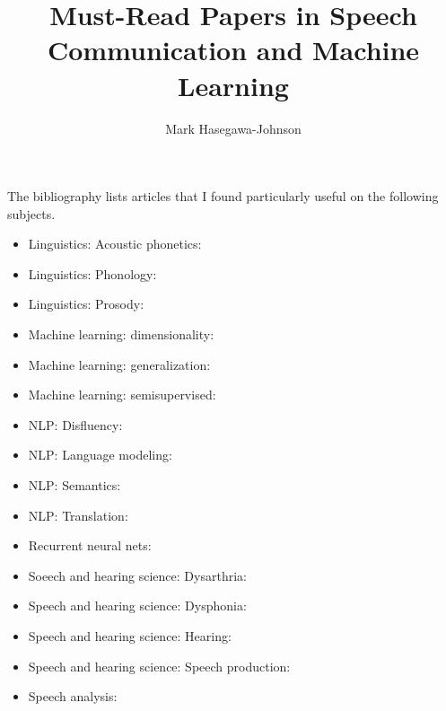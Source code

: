\documentclass{article}
\title{Must-Read Papers in Speech Communication and Machine Learning}
\author{Mark Hasegawa-Johnson}
\begin{document}
\maketitle

The bibliography lists articles that I found particularly useful on
the following subjects.

\begin{itemize}
\item Linguistics: Acoustic phonetics:~\cite{Blumstein79,Cranen87,Crystal88,Fant87,Fujimura62b,Hillenbrand95,KewleyPort83,LindauWebb86,Lisker75,Ohman65a,Stevens89a,Stevens87,Stevens93b,Syrdal86,Zue79}
\item Linguistics: Phonology:~\cite{Browman92,Jakobson52,Keyser94,Ohala89}
\item Linguistics: Prosody:~\cite{Cole03,Fougeron97b,Lindblom90,Price91,Silverman92,Tseng05,Wightman92}
\item Machine learning: dimensionality:~\cite{Aggarwal06,Roweis00b}
\item Machine learning: generalization:~\cite{Barron93,Barron94,Blumer89,Freund99,Haussler88,Haussler92,Valiant84}
\item Machine learning: semisupervised:~\cite{Cohn94,Dempster77}
\item NLP: Disfluency:~\cite{Heeman99,Liu03b,Nakatani94}
\item NLP: Language modeling:~\cite{Bellegarda00,Bilmes03b,Brown92b,Chen08,Miller63,Pargellis04,Wang04b}
\item NLP: Semantics:~\cite{Copestake99,Deerwester90}
\item NLP: Translation:~\cite{Brown93,Neubig2017a}
\item Recurrent neural nets:~\cite{Cho15}
\item Soeech and hearing science: Dysarthria:~\cite{Chen01,Darley69,Doyle97,Hustad03,Kent99,Kim10d,Weismer00,Yunusova05}
\item Speech and hearing science: Dysphonia:~\cite{Hertrich97,Herzel94,Ward69,Yumoto82}
\item Speech and hearing science: Hearing:~\cite{Brown94,Delgutte84a,Delgutte84d,Lyon96,Patterson76}
\item Speech and hearing science: Speech production:~\cite{Alwan97,Harshman77,Honda92,Ishizaka72b,Nam03,Stone90,Narayanan95a,Perkell93,Perrier96,Rothenberg83,Saltzman89,ShattuckHufnagel79,VatikiotisBateson93}
\item Speech analysis:~\cite{Duifhuis82,Mermelstein67,Mermelstein75,Noll67,Ozbek11a,Rabiner76,Schroeder67}

\end{itemize}
\end{document}
